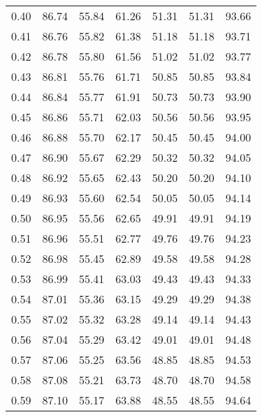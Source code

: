 \begin{tabular}{|c|c|c|c|c|c|c|}
      0.40 &     86.74 &     55.84 &      61.26 &   51.31 &      51.31 &         93.66 \\
      0.41 &     86.76 &     55.82 &      61.38 &   51.18 &      51.18 &         93.71 \\
      0.42 &     86.78 &     55.80 &      61.56 &   51.02 &      51.02 &         93.77 \\
      0.43 &     86.81 &     55.76 &      61.71 &   50.85 &      50.85 &         93.84 \\
      0.44 &     86.84 &     55.77 &      61.91 &   50.73 &      50.73 &         93.90 \\
      0.45 &     86.86 &     55.71 &      62.03 &   50.56 &      50.56 &         93.95 \\
      0.46 &     86.88 &     55.70 &      62.17 &   50.45 &      50.45 &         94.00 \\
      0.47 &     86.90 &     55.67 &      62.29 &   50.32 &      50.32 &         94.05 \\
      0.48 &     86.92 &     55.65 &      62.43 &   50.20 &      50.20 &         94.10 \\
      0.49 &     86.93 &     55.60 &      62.54 &   50.05 &      50.05 &         94.14 \\
      0.50 &     86.95 &     55.56 &      62.65 &   49.91 &      49.91 &         94.19 \\
      0.51 &     86.96 &     55.51 &      62.77 &   49.76 &      49.76 &         94.23 \\
      0.52 &     86.98 &     55.45 &      62.89 &   49.58 &      49.58 &         94.28 \\
      0.53 &     86.99 &     55.41 &      63.03 &   49.43 &      49.43 &         94.33 \\
      0.54 &     87.01 &     55.36 &      63.15 &   49.29 &      49.29 &         94.38 \\
      0.55 &     87.02 &     55.32 &      63.28 &   49.14 &      49.14 &         94.43 \\
      0.56 &     87.04 &     55.29 &      63.42 &   49.01 &      49.01 &         94.48 \\
      0.57 &     87.06 &     55.25 &      63.56 &   48.85 &      48.85 &         94.53 \\
      0.58 &     87.08 &     55.21 &      63.73 &   48.70 &      48.70 &         94.58 \\
      0.59 &     87.10 &     55.17 &      63.88 &   48.55 &      48.55 &         94.64 \\

\end{tabular}
